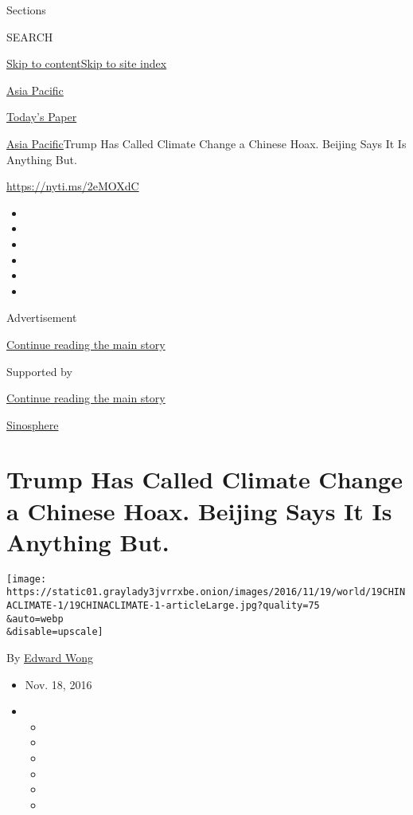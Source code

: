 Sections

SEARCH

\protect\hyperlink{site-content}{Skip to
content}\protect\hyperlink{site-index}{Skip to site index}

\href{https://www.nytimes3xbfgragh.onion/section/world/asia}{Asia
Pacific}

\href{https://myaccount.nytimes3xbfgragh.onion/auth/login?response_type=cookie\&client_id=vi}{}

\href{https://www.nytimes3xbfgragh.onion/section/todayspaper}{Today's
Paper}

\href{/section/world/asia}{Asia Pacific}\textbar{}Trump Has Called
Climate Change a Chinese Hoax. Beijing Says It Is Anything But.

\url{https://nyti.ms/2eMOXdC}

\begin{itemize}
\item
\item
\item
\item
\item
\item
\end{itemize}

Advertisement

\protect\hyperlink{after-top}{Continue reading the main story}

Supported by

\protect\hyperlink{after-sponsor}{Continue reading the main story}

\href{/column/sinosphere}{Sinosphere}

\hypertarget{trump-has-called-climate-change-a-chinese-hoax-beijing-says-it-is-anything-but}{%
\section{Trump Has Called Climate Change a Chinese Hoax. Beijing Says It
Is Anything
But.}\label{trump-has-called-climate-change-a-chinese-hoax-beijing-says-it-is-anything-but}}

\texttt{[image: https://static01.graylady3jvrrxbe.onion/images/2016/11/19/world/19CHINACLIMATE-1/19CHINACLIMATE-1-articleLarge.jpg?quality=75\\\&auto=webp\\\&disable=upscale]}

By \href{http://www.nytimes3xbfgragh.onion/by/edward-wong}{Edward Wong}

\begin{itemize}
\item
  Nov. 18, 2016
\item
  \begin{itemize}
  \item
  \item
  \item
  \item
  \item
  \item
  \end{itemize}
\end{itemize}

